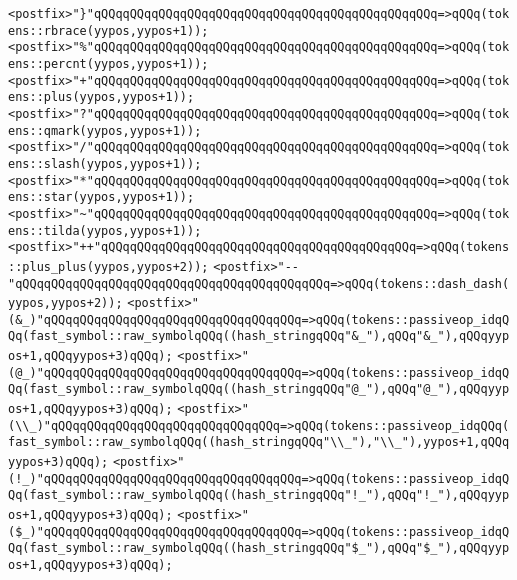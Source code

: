 \verb|<postfix>"}"qQQqqQQqqQQqqQQqqQQqqQQqqQQqqQQqqQQqqQQqqQQqqQQq=>qQQq(tokens::rbrace(yypos,yypos+1));|\newline
\verb|<postfix>"%"qQQqqQQqqQQqqQQqqQQqqQQqqQQqqQQqqQQqqQQqqQQqqQQq=>qQQq(tokens::percnt(yypos,yypos+1));|\newline
\verb|<postfix>"+"qQQqqQQqqQQqqQQqqQQqqQQqqQQqqQQqqQQqqQQqqQQqqQQq=>qQQq(tokens::plus(yypos,yypos+1));|\newline
\verb|<postfix>"?"qQQqqQQqqQQqqQQqqQQqqQQqqQQqqQQqqQQqqQQqqQQqqQQq=>qQQq(tokens::qmark(yypos,yypos+1));|\newline
\verb|<postfix>"/"qQQqqQQqqQQqqQQqqQQqqQQqqQQqqQQqqQQqqQQqqQQqqQQq=>qQQq(tokens::slash(yypos,yypos+1));|\newline
\verb|<postfix>"*"qQQqqQQqqQQqqQQqqQQqqQQqqQQqqQQqqQQqqQQqqQQqqQQq=>qQQq(tokens::star(yypos,yypos+1));|\newline
\verb|<postfix>"~"qQQqqQQqqQQqqQQqqQQqqQQqqQQqqQQqqQQqqQQqqQQqqQQq=>qQQq(tokens::tilda(yypos,yypos+1));|\newline
\verb|<postfix>"++"qQQqqQQqqQQqqQQqqQQqqQQqqQQqqQQqqQQqqQQqqQQq=>qQQq(tokens::plus_plus(yypos,yypos+2));|\newline
\verb|<postfix>"--"qQQqqQQqqQQqqQQqqQQqqQQqqQQqqQQqqQQqqQQqqQQq=>qQQq(tokens::dash_dash(yypos,yypos+2));|\newline
\verb|<postfix>"(&_)"qQQqqQQqqQQqqQQqqQQqqQQqqQQqqQQqqQQq=>qQQq(tokens::passiveop_idqQQq(fast_symbol::raw_symbolqQQq((hash_stringqQQq"&_"),qQQq"&_"),qQQqyypos+1,qQQqyypos+3)qQQq);|\newline
\verb|<postfix>"(@_)"qQQqqQQqqQQqqQQqqQQqqQQqqQQqqQQqqQQq=>qQQq(tokens::passiveop_idqQQq(fast_symbol::raw_symbolqQQq((hash_stringqQQq"@_"),qQQq"@_"),qQQqyypos+1,qQQqyypos+3)qQQq);|\newline
\verb|<postfix>"(\\_)"qQQqqQQqqQQqqQQqqQQqqQQqqQQqqQQq=>qQQq(tokens::passiveop_idqQQq(fast_symbol::raw_symbolqQQq((hash_stringqQQq"\\_"),"\\_"),yypos+1,qQQqyypos+3)qQQq);|\newline
\verb|<postfix>"(!_)"qQQqqQQqqQQqqQQqqQQqqQQqqQQqqQQqqQQq=>qQQq(tokens::passiveop_idqQQq(fast_symbol::raw_symbolqQQq((hash_stringqQQq"!_"),qQQq"!_"),qQQqyypos+1,qQQqyypos+3)qQQq);|\newline
\verb|<postfix>"($_)"qQQqqQQqqQQqqQQqqQQqqQQqqQQqqQQqqQQq=>qQQq(tokens::passiveop_idqQQq(fast_symbol::raw_symbolqQQq((hash_stringqQQq"$_"),qQQq"$_"),qQQqyypos+1,qQQqyypos+3)qQQq);|\newline
